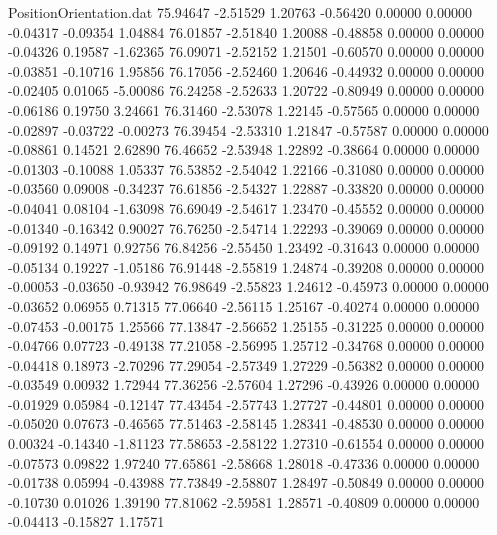\begin{filecontents}{PositionOrientation.dat}
  75.94647   -2.51529    1.20763    -0.56420    0.00000    0.00000   -0.04317   -0.09354    1.04884
  76.01857   -2.51840    1.20088    -0.48858    0.00000    0.00000   -0.04326    0.19587   -1.62365
  76.09071   -2.52152    1.21501    -0.60570    0.00000    0.00000   -0.03851   -0.10716    1.95856
  76.17056   -2.52460    1.20646    -0.44932    0.00000    0.00000   -0.02405    0.01065   -5.00086
  76.24258   -2.52633    1.20722    -0.80949    0.00000    0.00000   -0.06186    0.19750    3.24661
  76.31460   -2.53078    1.22145    -0.57565    0.00000    0.00000   -0.02897   -0.03722   -0.00273
  76.39454   -2.53310    1.21847    -0.57587    0.00000    0.00000   -0.08861    0.14521    2.62890
  76.46652   -2.53948    1.22892    -0.38664    0.00000    0.00000   -0.01303   -0.10088    1.05337
  76.53852   -2.54042    1.22166    -0.31080    0.00000    0.00000   -0.03560    0.09008   -0.34237
  76.61856   -2.54327    1.22887    -0.33820    0.00000    0.00000   -0.04041    0.08104   -1.63098
  76.69049   -2.54617    1.23470    -0.45552    0.00000    0.00000   -0.01340   -0.16342    0.90027
  76.76250   -2.54714    1.22293    -0.39069    0.00000    0.00000   -0.09192    0.14971    0.92756
  76.84256   -2.55450    1.23492    -0.31643    0.00000    0.00000   -0.05134    0.19227   -1.05186
  76.91448   -2.55819    1.24874    -0.39208    0.00000    0.00000   -0.00053   -0.03650   -0.93942
  76.98649   -2.55823    1.24612    -0.45973    0.00000    0.00000   -0.03652    0.06955    0.71315
  77.06640   -2.56115    1.25167    -0.40274    0.00000    0.00000   -0.07453   -0.00175    1.25566
  77.13847   -2.56652    1.25155    -0.31225    0.00000    0.00000   -0.04766    0.07723   -0.49138
  77.21058   -2.56995    1.25712    -0.34768    0.00000    0.00000   -0.04418    0.18973   -2.70296
  77.29054   -2.57349    1.27229    -0.56382    0.00000    0.00000   -0.03549    0.00932    1.72944
  77.36256   -2.57604    1.27296    -0.43926    0.00000    0.00000   -0.01929    0.05984   -0.12147
  77.43454   -2.57743    1.27727    -0.44801    0.00000    0.00000   -0.05020    0.07673   -0.46565
  77.51463   -2.58145    1.28341    -0.48530    0.00000    0.00000    0.00324   -0.14340   -1.81123
  77.58653   -2.58122    1.27310    -0.61554    0.00000    0.00000   -0.07573    0.09822    1.97240
  77.65861   -2.58668    1.28018    -0.47336    0.00000    0.00000   -0.01738    0.05994   -0.43988
  77.73849   -2.58807    1.28497    -0.50849    0.00000    0.00000   -0.10730    0.01026    1.39190
  77.81062   -2.59581    1.28571    -0.40809    0.00000    0.00000   -0.04413   -0.15827    1.17571

\end{filecontents}
